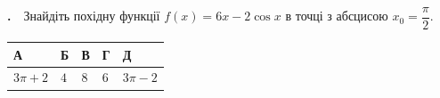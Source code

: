 \documentclass[12pt]{article}
\newlength{\nmtcellw}
\newcommand{\nmtSetCell}{\setlength{\nmtcellw}{\dimexpr(\linewidth-10\tabcolsep-6\arrayrulewidth)/5\relax}}
\newcommand{\answerTable}[5]{%
\par\nopagebreak\vspace{0.15cm}
\noindent\nmtSetCell
\begin{tabular}{|*{5}{>{\centering\arraybackslash}m{\nmtcellw}|}}
\hline
\rule[-0.15cm]{0pt}{0.6cm}\textbf{А} & \rule[-0.15cm]{0pt}{0.6cm}\textbf{Б} & \rule[-0.15cm]{0pt}{0.6cm}\textbf{В} & \rule[-0.15cm]{0pt}{0.6cm}\textbf{Г} & \rule[-0.15cm]{0pt}{0.6cm}\textbf{Д} \\
\hline
\rule[-0.2cm]{0pt}{0.75cm}#1 & \rule[-0.2cm]{0pt}{0.75cm}#2 & \rule[-0.2cm]{0pt}{0.75cm}#3 & \rule[-0.2cm]{0pt}{0.75cm}#4 & \rule[-0.2cm]{0pt}{0.75cm}#5 \\
\hline
\end{tabular}
\par\vspace{0.25cm}
}
\newcommand{\matchingGrid}{%
    \sbox{\nmtgridbox}{\matchingGridRaw}%
    \ifdim\wd\nmtgridbox>\linewidth \resizebox{\linewidth}{!}{\usebox{\nmtgridbox}}\else\usebox{\nmtgridbox}\fi}
\newcommand{\matchingGridRaw}{%
    \begingroup
    \renewcommand{\arraystretch}{1.15}
    \setlength{\tabcolsep}{4pt}
    \footnotesize
    \begin{tabular}{r|c|c|c|c|c|}
         \multicolumn{1}{c}{} & \multicolumn{1}{c}{\textbf{А}} & \multicolumn{1}{c}{\textbf{Б}} & \multicolumn{1}{c}{\textbf{В}} & \multicolumn{1}{c}{\textbf{Г}} & \multicolumn{1}{c}{\textbf{Д}} \\ \cline{2-6}
         \textbf{1} & \phantom{X} & \phantom{X} & \phantom{X} & \phantom{X} & \phantom{X} \\ \cline{2-6}
         \textbf{2} & & & & & \\ \cline{2-6}
         \textbf{3} & & & & & \\ \cline{2-6}
    \end{tabular}
    \endgroup
}
\newcounter{zad}
\newcommand{\zadnum}{\stepcounter{zad}\textbf{\thezad.}\ \ }
\newcounter{ans}
\newcommand{\nbvspace}[1]{\nopagebreak\vspace{#1}}
\newcommand{\nmtnobreak}{\ifvmode\penalty10000 \fi}
\begin{document}
\providecommand{\trigStyle}[1]{#1}
\providecommand{\answerTableSmall}[5]{%
\begingroup\setlength{\tabcolsep}{2pt}\small\nmtSetCell
\begin{tabular}{|*{5}{>{\centering\arraybackslash}m{\nmtcellw}|}}
\hline
\rule[-0.2cm]{0pt}{0.6cm}\textbf{А} & \textbf{Б} & \textbf{В} & \textbf{Г} & \textbf{Д} \\
\hline
\rule[-0.4cm]{0pt}{0.9cm}#1 & \rule[-0.4cm]{0pt}{0.9cm}#2 & \rule[-0.4cm]{0pt}{0.9cm}#3 & \rule[-0.4cm]{0pt}{0.9cm}#4 & \rule[-0.4cm]{0pt}{0.9cm}#5 \\
\hline
\end{tabular}\endgroup}
\providecommand{\matchingLayout}[3]{%
    \noindent
    \begin{minipage}[t]{0.36\textwidth}\vspace{0pt}\raggedright
        #1
    \end{minipage}%
    \hfill
    \begin{minipage}[t]{0.43\textwidth}\vspace{0pt}\raggedright
        #2
    \end{minipage}%
    \hfill
    \begin{minipage}[t]{0.19\textwidth}
        \vspace{0pt}
        \begin{flushright}
        #3
        \end{flushright}
    \end{minipage}}
\providecommand{\matchingLayoutBottom}[2]{%
    \noindent
    \begin{minipage}[t]{0.48\textwidth}\vspace{0pt}\raggedright
        #1
    \end{minipage}%
    \hfill
    \begin{minipage}[t]{0.48\textwidth}\vspace{0pt}\raggedright
        #2
    \end{minipage}
    \vspace{0.5cm}
    \noindent
    \matchingGrid}
\providecommand{\answerListVertical}[5]{%
    \par\nopagebreak\vspace{0.2cm}
    \begin{itemize}[itemsep=0.4cm, leftmargin=1.5cm, labelsep=0.5cm]
        \item[\textbf{А}] #1
        \item[\textbf{Б}] #2
        \item[\textbf{В}] #3
        \item[\textbf{Г}] #4
        \item[\textbf{Д}] #5
    \end{itemize}
    \vspace{0.2cm}}
\begin{samepage}
\noindent\zadnum Знайдіть похідну функції $f(x) = 6x - 2\cos x$ в точці з абсцисою $x_0 = \dfrac{\pi}{2}$.

\nmtnobreak
\nopagebreak\nbvspace{0.3cm}
\answerTable{$3\pi + 2$}{$4$}{$8$}{$6$}{$3\pi - 2$}
\par{}
\end{samepage}
\endgroup
\end{document}
